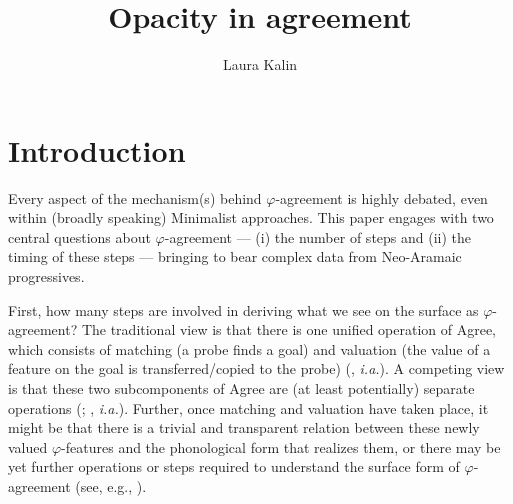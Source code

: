 \documentclass[output=paper
,modfonts
,nonflat]{langsci/langscibook}
\title{Opacity in agreement}
\author{Laura Kalin\affiliation{Princeton University}}
\begin{document}

\maketitle
\section{Introduction} \label{sec-kalin:1}

Every aspect of the mechanism(s) behind $\varphi$-agreement is highly debated, even within (broadly speaking) Minimalist approaches. This paper engages with two central questions about $\varphi$-agreement ---  (i) the number of steps and (ii) the timing of these steps --- bringing to bear complex data from Neo-Aramaic progressives.

First, how many steps are involved in deriving what we see on the surface as $\varphi$-agreement? The traditional view is that there is one unified operation of Agree, which consists of matching (a probe finds a goal) and valuation (the value of a feature on the goal is transferred/copied to the probe) (\citealt{Chomsky00,Chomsky01,Bejar03,Preminger11,Preminger14}, \textit{i.a.}). A competing view is that these two subcomponents of Agree are (at least potentially) separate operations (\citealt{vanKoppen07,BBP09,ArregiNevins12,BhattWalkow13,Bonet13,Marusicetal15, Smith17, AtlamazBakerTA}; , \textit{i.a.}). Further, once matching and valuation have taken place, it might be that there is a trivial and transparent relation between these newly valued $\varphi$-features and the phonological form that realizes them, or there may be yet further operations or steps required to understand the surface form of $\varphi$-agreement (see, e.g., \citealt{ArregiNevins12}).
\end{document}
